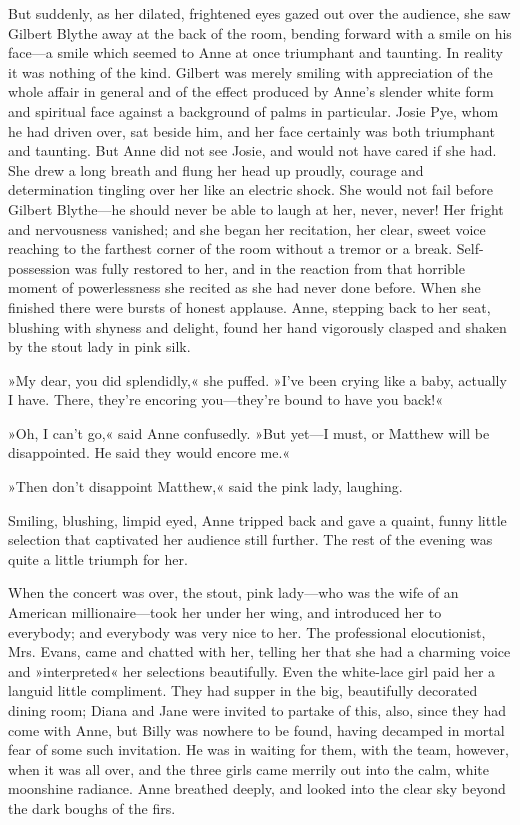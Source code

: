 But suddenly, as her dilated, frightened eyes gazed out over the audience, she saw Gilbert Blythe away at the back of the room, bending forward with a smile on his face—a smile which seemed to Anne at once triumphant and taunting. In reality it was nothing of the kind. Gilbert was merely smiling with appreciation of the whole affair in general and of the effect produced by Anne’s slender white form and spiritual face against a background of palms in particular. Josie Pye, whom he had driven over, sat beside him, and her face certainly was both triumphant and taunting. But Anne did not see Josie, and would not have cared if she had. She drew a long breath and flung her head up proudly, courage and determination tingling over her like an electric shock. She would not fail before Gilbert Blythe—he should never be able to laugh at her, never, never! Her fright and nervousness vanished; and she began her recitation, her clear, sweet voice reaching to the farthest corner of the room without a tremor or a break. Self-possession was fully restored to her, and in the reaction from that horrible moment of powerlessness she recited as she had never done before. When she finished there were bursts of honest applause. Anne, stepping back to her seat, blushing with shyness and delight, found her hand vigorously clasped and shaken by the stout lady in pink silk.

»My dear, you did splendidly,« she puffed. »I’ve been crying like a baby, actually I have. There, they’re encoring you—they’re bound to have you back!«

»Oh, I can’t go,« said Anne confusedly. »But yet—I must, or Matthew will be disappointed. He said they would encore me.«

»Then don’t disappoint Matthew,« said the pink lady, laughing.

Smiling, blushing, limpid eyed, Anne tripped back and gave a quaint, funny little selection that captivated her audience still further. The rest of the evening was quite a little triumph for her.

When the concert was over, the stout, pink lady—who was the wife of an American millionaire—took her under her wing, and introduced her to everybody; and everybody was very nice to her. The professional elocutionist, Mrs. Evans, came and chatted with her, telling her that she had a charming voice and »interpreted« her selections beautifully. Even the white-lace girl paid her a languid little compliment. They had supper in the big, beautifully decorated dining room; Diana and Jane were invited to partake of this, also, since they had come with Anne, but Billy was nowhere to be found, having decamped in mortal fear of some such invitation. He was in waiting for them, with the team, however, when it was all over, and the three girls came merrily out into the calm, white moonshine radiance. Anne breathed deeply, and looked into the clear sky beyond the dark boughs of the firs.


